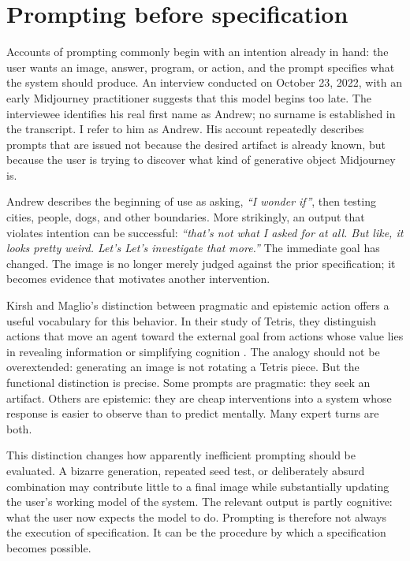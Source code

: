 \documentclass[11pt]{article}
\newcommand{\interview}[1]{\emph{#1}}
\begin{document}
\section{Prompting before specification}
Accounts of prompting commonly begin with an intention already in hand: the user wants an image, answer, program, or action, and the prompt specifies what the system should produce. An interview conducted on October 23, 2022, with an early Midjourney practitioner suggests that this model begins too late. The interviewee identifies his real first name as Andrew; no surname is established in the transcript. I refer to him as Andrew. His account repeatedly describes prompts that are issued not because the desired artifact is already known, but because the user is trying to discover what kind of generative object Midjourney is.

Andrew describes the beginning of use as asking, \interview{``I wonder if''}, then testing cities, people, dogs, and other boundaries. More strikingly, an output that violates intention can be successful: \interview{``that's not what I asked for at all. But like, it looks pretty weird. Let's Let's investigate that more.''} The immediate goal has changed. The image is no longer merely judged against the prior specification; it becomes evidence that motivates another intervention.

Kirsh and Maglio's distinction between pragmatic and epistemic action offers a useful vocabulary for this behavior. In their study of Tetris, they distinguish actions that move an agent toward the external goal from actions whose value lies in revealing information or simplifying cognition \citep{kirsh1994epistemic}. The analogy should not be overextended: generating an image is not rotating a Tetris piece. But the functional distinction is precise. Some prompts are pragmatic: they seek an artifact. Others are epistemic: they are cheap interventions into a system whose response is easier to observe than to predict mentally. Many expert turns are both.

This distinction changes how apparently inefficient prompting should be evaluated. A bizarre generation, repeated seed test, or deliberately absurd combination may contribute little to a final image while substantially updating the user's working model of the system. The relevant output is partly cognitive: what the user now expects the model to do. Prompting is therefore not always the execution of specification. It can be the procedure by which a specification becomes possible.
\end{document}
